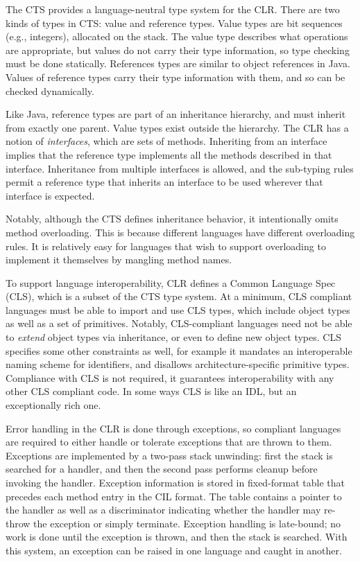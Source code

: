 The CTS provides a language-neutral type system for the CLR. There are two kinds of types in CTS: value and reference types. Value types are bit sequences (e.g., integers), allocated on the stack. The value type describes what operations are appropriate, but values do not carry their type information, so type checking must be done statically. References types are similar to object references in Java. Values of reference types carry their type information with them, and so can be checked dynamically.

Like Java, reference types are part of an inheritance hierarchy, and must inherit from exactly one parent. Value types exist outside the hierarchy. The CLR has a notion of \emph{interfaces}, which are sets of methods. Inheriting from an interface implies that the reference type implements all the methods described in that interface. Inheritance from multiple interfaces is allowed, and the sub-typing rules permit a reference type that inherits an interface to be used wherever that interface is expected.

Notably, although the CTS defines inheritance behavior, it intentionally omits method overloading. This is because different languages have different overloading rules. It is relatively easy for languages that wish to support overloading to implement it themselves by mangling method names.

To support language interoperability, CLR defines a Common Language Spec (CLS), which is a subset of the CTS type system. At a minimum, CLS compliant languages must be able to import and use CLS types, which include object types as well as a set of primitives. Notably, CLS-compliant languages need not be able to \emph{extend} object types via inheritance, or even to define new object types. CLS specifies some other constraints as well, for example it mandates an interoperable naming scheme for identifiers, and disallows architecture-specific primitive types. Compliance with CLS is not required, it guarantees interoperability with any other CLS compliant code. In some ways CLS is like an IDL, but an exceptionally rich one.

Error handling in the CLR is done through exceptions, so compliant languages are required to either handle or tolerate exceptions that are thrown to them. Exceptions are implemented by a two-pass stack unwinding: first the stack is searched for a handler, and then the second pass performs cleanup before invoking the handler. Exception information is stored in fixed-format table that precedes each method entry in the CIL format. The table contains a pointer to the handler as well as a discriminator indicating whether the handler may re-throw the exception or simply terminate. Exception handling is late-bound; no work is done until the exception is thrown, and then the stack is searched. With this system, an exception can be raised in one language and caught in another.


